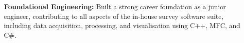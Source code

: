 \begin{cventries}
{\begin{cvitems}
        \item {\textbf{Foundational Engineering:} Built a strong career foundation as a junior engineer, contributing to all aspects of the in-house survey software suite, including data acquisition, processing, and visualisation using C++, MFC, and C\#.}
      \end{cvitems}
    }
\end{cventries}

